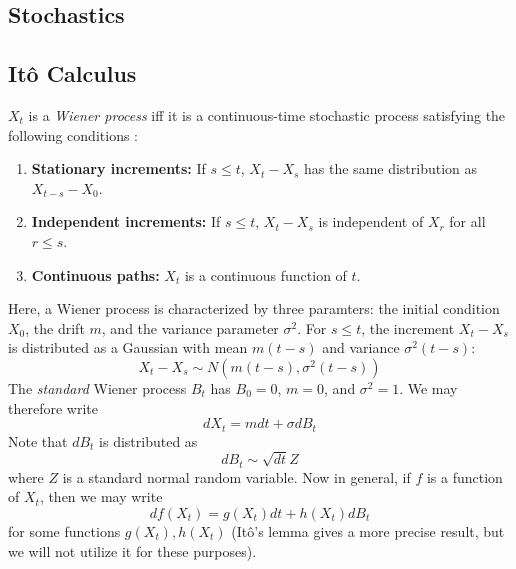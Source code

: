 \documentclass[letterpaper,12pt]{article}
\numberwithin{table}{section}
\numberwithin{figure}{section}
\numberwithin{equation}{section}
\begin{document}
\begin{flushleft}
    \pagebreak

    \section{Stochastics}

    \subsection{It\^o Calculus}

    $X_t$ is a \textit{Wiener process} iff it is a continuous-time stochastic process satisfying the following conditions \cite{finbook}:
    \begin{enumerate}
        \item \textbf{Stationary increments:} If $s \leq t$, $X_t - X_s$ has the same distribution as $X_{t-s} - X_0$.
        \item \textbf{Independent increments:} If $s \leq t$, $X_t - X_s$ is independent of $X_r$ for all $r \leq s$.
        \item \textbf{Continuous paths:} $X_t$ is a continuous function of $t$.
    \end{enumerate}

    Here, a Wiener process is characterized by three paramters: the initial condition $X_0$, the drift $m$, and the variance parameter $\sigma^2$. For $s \leq t$, the increment $X_t - X_s$ is distributed as a Gaussian with mean $m(t - s)$ and variance $\sigma^2(t-s)$:
    \begin{equation}
        X_t - X_s \sim N\left(m(t - s), \sigma^2 (t - s)\right)
    \end{equation}
    The \textit{standard} Wiener process $B_t$ has $B_0 = 0$, $m = 0$, and $\sigma^2 = 1$. We may therefore write
    \begin{equation}
        dX_t = m dt + \sigma dB_t
    \end{equation}
    Note that $dB_t$ is distributed as
    \begin{equation}
        dB_t \sim \sqrt{dt}Z
    \end{equation}
    where $Z$ is a standard normal random variable. Now in general, if $f$ is a function of $X_t$, then we may write
    \begin{equation}
        df(X_t) = g(X_t) dt + h(X_t) dB_t
    \end{equation}
    for some functions $g(X_t), h(X_t)$ (It\^o's lemma gives a more precise result, but we will not utilize it for these purposes).


\end{flushleft}
\end{document}
